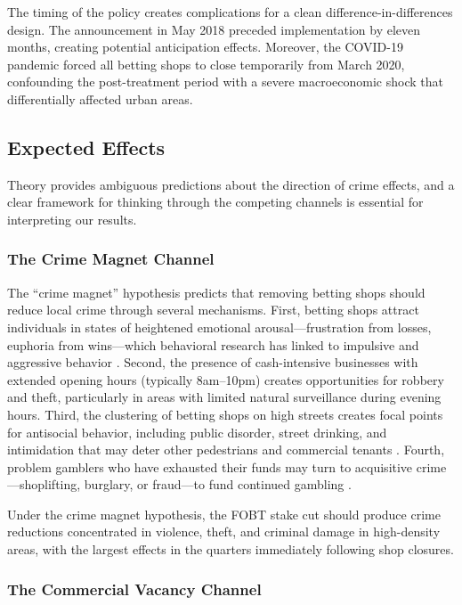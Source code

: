 \documentclass[12pt]{article}
\begin{document}
The timing of the policy creates complications for a clean difference-in-differences design. The announcement in May 2018 preceded implementation by eleven months, creating potential anticipation effects. Moreover, the COVID-19 pandemic forced all betting shops to close temporarily from March 2020, confounding the post-treatment period with a severe macroeconomic shock that differentially affected urban areas.

\subsection{Expected Effects}

Theory provides ambiguous predictions about the direction of crime effects, and a clear framework for thinking through the competing channels is essential for interpreting our results.

\subsubsection{The Crime Magnet Channel}

The ``crime magnet'' hypothesis predicts that removing betting shops should reduce local crime through several mechanisms. First, betting shops attract individuals in states of heightened emotional arousal---frustration from losses, euphoria from wins---which behavioral research has linked to impulsive and aggressive behavior \citep{wardle2014}. Second, the presence of cash-intensive businesses with extended opening hours (typically 8am--10pm) creates opportunities for robbery and theft, particularly in areas with limited natural surveillance during evening hours. Third, the clustering of betting shops on high streets creates focal points for antisocial behavior, including public disorder, street drinking, and intimidation that may deter other pedestrians and commercial tenants \citep{markham2016}. Fourth, problem gamblers who have exhausted their funds may turn to acquisitive crime---shoplifting, burglary, or fraud---to fund continued gambling \citep{nlc2004}.

Under the crime magnet hypothesis, the FOBT stake cut should produce crime reductions concentrated in violence, theft, and criminal damage in high-density areas, with the largest effects in the quarters immediately following shop closures.

\subsubsection{The Commercial Vacancy Channel}
\end{document}
